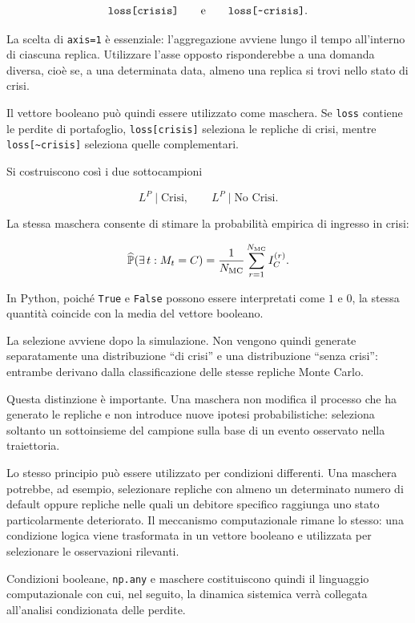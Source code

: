 \[
\texttt{loss[crisis]}
\qquad\text{e}\qquad
\texttt{loss[{\symbol{126}}crisis]}.
\]


La scelta di \texttt{axis=1} \`e essenziale: l'aggregazione avviene lungo il
tempo all'interno di ciascuna replica. Utilizzare l'asse opposto
risponderebbe a una domanda diversa, cio\`e se, a una determinata data,
almeno una replica si trovi nello stato di crisi.

Il vettore booleano pu\`o quindi essere utilizzato come maschera. Se
\texttt{loss} contiene le perdite di portafoglio, \texttt{loss[crisis]}
seleziona le repliche di crisi, mentre
\texttt{loss[\textasciitilde crisis]} seleziona quelle complementari.

Si costruiscono cos\`i i due sottocampioni

\[
L^P\mid\text{Crisi},
\qquad
L^P\mid\text{No Crisi}.
\]

La stessa maschera consente di stimare la probabilit\`a empirica di ingresso
in crisi:

\[
\widehat{\mathbb{P}}(\exists\,t:M_t=C)
=
\frac{1}{N_{\mathrm{MC}}}
\sum_{r=1}^{N_{\mathrm{MC}}} I_C^{(r)}.
\]

In Python, poich\'e \texttt{True} e \texttt{False} possono essere
interpretati come $1$ e $0$, la stessa quantit\`a coincide con la media del
vettore booleano.

La selezione avviene dopo la simulazione. Non vengono quindi generate
separatamente una distribuzione ``di crisi'' e una distribuzione ``senza
crisi'': entrambe derivano dalla classificazione delle stesse repliche Monte
Carlo.

Questa distinzione \`e importante. Una maschera non modifica il processo che
ha generato le repliche e non introduce nuove ipotesi probabilistiche:
seleziona soltanto un sottoinsieme del campione sulla base di un evento
osservato nella traiettoria.

Lo stesso principio pu\`o essere utilizzato per condizioni differenti. Una
maschera potrebbe, ad esempio, selezionare repliche con almeno un determinato
numero di default oppure repliche nelle quali un debitore specifico raggiunga
uno stato particolarmente deteriorato. Il meccanismo computazionale rimane
lo stesso: una condizione logica viene trasformata in un vettore booleano e
utilizzata per selezionare le osservazioni rilevanti.

Condizioni booleane, \texttt{np.any} e maschere costituiscono quindi il
linguaggio computazionale con cui, nel seguito, la dinamica sistemica verr\`a
collegata all'analisi condizionata delle perdite.
%

